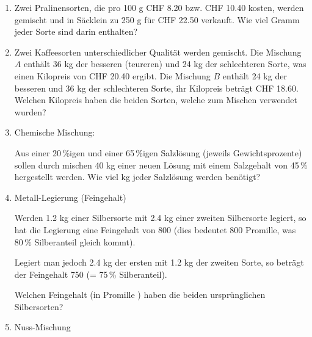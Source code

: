 \begin{enumerate}[label=\alph*)]
\item Zwei Pralinensorten, die pro 100 g CHF 8.20 bzw. CHF 10.40
kosten, werden gemischt und in Säcklein zu 250 g für CHF 22.50 verkauft. Wie
viel Gramm jeder Sorte sind darin enthalten?

\item

Zwei Kaffeesorten unterschiedlicher Qualität werden gemischt. Die
Mischung $A$ enthält 36 kg der besseren (teureren) und 24 kg der
schlechteren Sorte, was einen Kilopreis von CHF 20.40 ergibt. Die
Mischung $B$ enthält 24 kg der besseren und 36 kg der schlechteren
Sorte, ihr Kilopreis beträgt CHF 18.60. Welchen Kilopreis haben die
beiden Sorten, welche zum Mischen verwendet wurden?

\item
Chemische Mischung:

Aus einer 20\,\%igen und einer
65\,\%igen Salzlösung (jeweils Gewichtsprozente) sollen durch mischen 40
kg einer neuen Lösung mit einem Salzgehalt von 45\,\% hergestellt
werden. Wie viel kg jeder Salzlösung werden benötigt?

\item
Metall-Legierung (Feingehalt)

Werden 1.2 kg einer Silbersorte mit 2.4 kg einer zweiten Silbersorte
legiert, so hat die Legierung eine Feingehalt von 800 (dies bedeutet
800 Promille, was 80\,\% Silberanteil gleich kommt).

Legiert man jedoch 2.4 kg der ersten mit 1.2 kg der zweiten Sorte, so
beträgt der Feingehalt 750 (= 75\,\% Silberanteil).

Welchen Feingehalt (in Promille \textperthousand) haben die beiden ursprünglichen
Silbersorten?

\item Nuss-Mischung


\end{enumerate}
